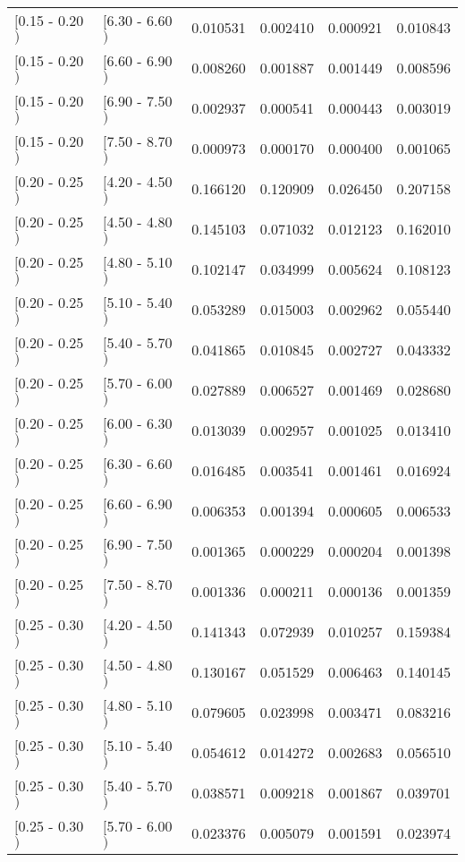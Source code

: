 \begin{longtable}{| l | l | r | r | r | r |}
$[$0.15 - 0.20$)$ & $[$6.30 - 6.60$)$ & 0.010531 & 0.002410 & 0.000921 & 0.010843 \\
$[$0.15 - 0.20$)$ & $[$6.60 - 6.90$)$ & 0.008260 & 0.001887 & 0.001449 & 0.008596 \\
$[$0.15 - 0.20$)$ & $[$6.90 - 7.50$)$ & 0.002937 & 0.000541 & 0.000443 & 0.003019 \\
$[$0.15 - 0.20$)$ & $[$7.50 - 8.70$)$ & 0.000973 & 0.000170 & 0.000400 & 0.001065 \\
$[$0.20 - 0.25$)$ & $[$4.20 - 4.50$)$ & 0.166120 & 0.120909 & 0.026450 & 0.207158 \\
$[$0.20 - 0.25$)$ & $[$4.50 - 4.80$)$ & 0.145103 & 0.071032 & 0.012123 & 0.162010 \\
$[$0.20 - 0.25$)$ & $[$4.80 - 5.10$)$ & 0.102147 & 0.034999 & 0.005624 & 0.108123 \\
$[$0.20 - 0.25$)$ & $[$5.10 - 5.40$)$ & 0.053289 & 0.015003 & 0.002962 & 0.055440 \\
$[$0.20 - 0.25$)$ & $[$5.40 - 5.70$)$ & 0.041865 & 0.010845 & 0.002727 & 0.043332 \\
$[$0.20 - 0.25$)$ & $[$5.70 - 6.00$)$ & 0.027889 & 0.006527 & 0.001469 & 0.028680 \\
$[$0.20 - 0.25$)$ & $[$6.00 - 6.30$)$ & 0.013039 & 0.002957 & 0.001025 & 0.013410 \\
$[$0.20 - 0.25$)$ & $[$6.30 - 6.60$)$ & 0.016485 & 0.003541 & 0.001461 & 0.016924 \\
$[$0.20 - 0.25$)$ & $[$6.60 - 6.90$)$ & 0.006353 & 0.001394 & 0.000605 & 0.006533 \\
$[$0.20 - 0.25$)$ & $[$6.90 - 7.50$)$ & 0.001365 & 0.000229 & 0.000204 & 0.001398 \\
$[$0.20 - 0.25$)$ & $[$7.50 - 8.70$)$ & 0.001336 & 0.000211 & 0.000136 & 0.001359 \\
$[$0.25 - 0.30$)$ & $[$4.20 - 4.50$)$ & 0.141343 & 0.072939 & 0.010257 & 0.159384 \\
$[$0.25 - 0.30$)$ & $[$4.50 - 4.80$)$ & 0.130167 & 0.051529 & 0.006463 & 0.140145 \\
$[$0.25 - 0.30$)$ & $[$4.80 - 5.10$)$ & 0.079605 & 0.023998 & 0.003471 & 0.083216 \\
$[$0.25 - 0.30$)$ & $[$5.10 - 5.40$)$ & 0.054612 & 0.014272 & 0.002683 & 0.056510 \\
$[$0.25 - 0.30$)$ & $[$5.40 - 5.70$)$ & 0.038571 & 0.009218 & 0.001867 & 0.039701 \\
$[$0.25 - 0.30$)$ & $[$5.70 - 6.00$)$ & 0.023376 & 0.005079 & 0.001591 & 0.023974 \\

\end{longtable}
